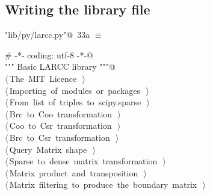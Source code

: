 \documentclass[11pt,oneside]{article}	%
\begin{document}
\subsection{Writing the library file}

\begin{flushleft} \small
\begin{minipage}{\linewidth} \label{scrap56}
\protect{}\verb@"lib/py/larcc.py"@\nobreak\ {\footnotesize 33a }$\equiv$
\vspace{-1ex}
\begin{list}{}{} \item
\mbox{}\verb@# -*- coding: utf-8 -*-@\\
\mbox{}\verb@""" Basic LARCC library """@\\
\mbox{}\verb@@\hbox{$\langle\,$The MIT Licence\nobreak\ {\footnotesize {}}$\,\rangle$}\verb@@\\
\mbox{}\verb@@\hbox{$\langle\,$Importing of modules or packages\nobreak\ {\footnotesize {}}$\,\rangle$}\verb@@\\
\mbox{}\verb@@\hbox{$\langle\,$From list of triples to scipy.sparse\nobreak\ {\footnotesize {}}$\,\rangle$}\verb@@\\
\mbox{}\verb@@\hbox{$\langle\,$Brc to Coo transformation\nobreak\ {\footnotesize {}}$\,\rangle$}\verb@@\\
\mbox{}\verb@@\hbox{$\langle\,$Coo to Csr transformation\nobreak\ {\footnotesize {}}$\,\rangle$}\verb@@\\
\mbox{}\verb@@\hbox{$\langle\,$Brc to Csr transformation\nobreak\ {\footnotesize {}}$\,\rangle$}\verb@@\\
\mbox{}\verb@@\hbox{$\langle\,$Query Matrix shape\nobreak\ {\footnotesize {}}$\,\rangle$}\verb@@\\
\mbox{}\verb@@\hbox{$\langle\,$Sparse to dense matrix transformation\nobreak\ {\footnotesize {}}$\,\rangle$}\verb@@\\
\mbox{}\verb@@\hbox{$\langle\,$Matrix product and transposition\nobreak\ {\footnotesize {}}$\,\rangle$}\verb@@\\
\mbox{}\verb@@\hbox{$\langle\,$Matrix filtering to produce the boundary matrix\nobreak\ {\footnotesize {}}$\,\rangle$}\verb@@\\

\end{list}
\end{minipage}
\end{flushleft}
\end{document}
